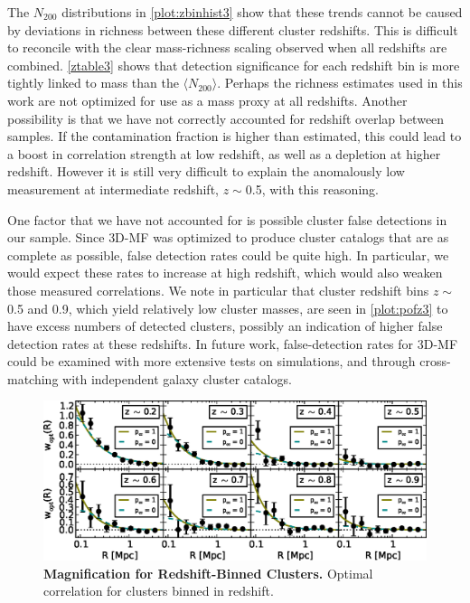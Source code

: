 The $N_{200}$ distributions in \autoref{plot:zbinhist3} show that these trends cannot be caused by deviations in richness between these different cluster redshifts. This is difficult to reconcile with the clear mass-richness scaling observed when all redshifts are combined. \autoref{ztable3} shows that detection significance for each redshift bin is more tightly linked to mass than the $\langle N_{200} \rangle$. Perhaps the richness estimates used in this work are not optimized for use as a mass proxy at all redshifts. Another possibility is that we have not correctly accounted for redshift overlap between samples. If the contamination fraction is higher than estimated, this could lead to a boost in correlation strength at low redshift, as well as a depletion at higher redshift. However it is still very difficult to explain the anomalously low measurement at intermediate redshift, $z \sim$0.5, with this reasoning.

One factor that we have not accounted for is possible cluster false detections in our sample. Since \ac{3D-MF} was optimized to produce cluster catalogs that are as complete as possible, false detection rates could be quite high. In particular, we would expect these rates to increase at high redshift, which would also weaken those measured correlations. We note in particular that cluster redshift bins $z \sim$ 0.5 and 0.9, which yield relatively low cluster masses, are seen in \autoref{plot:pofz3} to have excess numbers of detected clusters, possibly an indication of higher false detection rates at these redshifts. In future work, false-detection rates for \ac{3D-MF} could be examined with more extensive tests on simulations, and through cross-matching with independent galaxy cluster catalogs.


\begin{figure}
\begin{center}
\includegraphics[scale=0.9]{plots_ch3/wopt_z_panels_U.eps}
\caption[Magnification for Redshift-Binned Clusters]{{\bf Magnification for Redshift-Binned Clusters.} Optimal correlation for clusters binned in redshift.}
\label{plot:zbinw3}
\end{center}
\end{figure}


